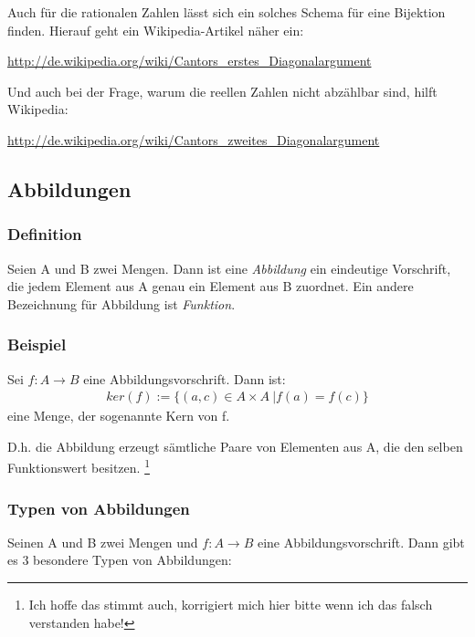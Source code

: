 \documentclass[a4paper,12pt, DIV12]{scrartcl}
\begin{document}
Auch für die rationalen Zahlen lässt sich ein solches Schema für eine Bijektion finden.
Hierauf geht ein Wikipedia-Artikel näher ein:

\url{http://de.wikipedia.org/wiki/Cantors_erstes_Diagonalargument}

Und auch bei der Frage, warum die reellen Zahlen nicht abzählbar sind, hilft Wikipedia:

\url{http://de.wikipedia.org/wiki/Cantors_zweites_Diagonalargument}

\subsection{Abbildungen}
\subsubsection{Definition}
Seien A und B zwei Mengen.
Dann ist eine \emph{Abbildung} ein eindeutige Vorschrift, die jedem Element aus A genau ein Element aus B zuordnet.
Ein andere Bezeichnung für Abbildung ist \emph{Funktion}.
\subsubsection{Beispiel}
Sei $f:{A}\longrightarrow{B}$ eine Abbildungsvorschrift.
Dann ist:
\begin{align*}
   ker(f) := \{(a,c) \in A \times A\ | f(a)=f(c)\}
\end{align*}
eine Menge, der sogenannte Kern von f.

D.h. die Abbildung erzeugt sämtliche Paare von Elementen aus A, die den selben Funktionswert besitzen.
\footnote{Ich hoffe das stimmt auch, korrigiert mich hier bitte wenn
  ich das falsch verstanden habe!}
\newpage
\subsubsection{Typen von Abbildungen}
Seinen A und B zwei Mengen und $f:{A}\longrightarrow{B}$ eine Abbildungsvorschrift.
Dann gibt es 3 besondere Typen von Abbildungen:
\end{document}
